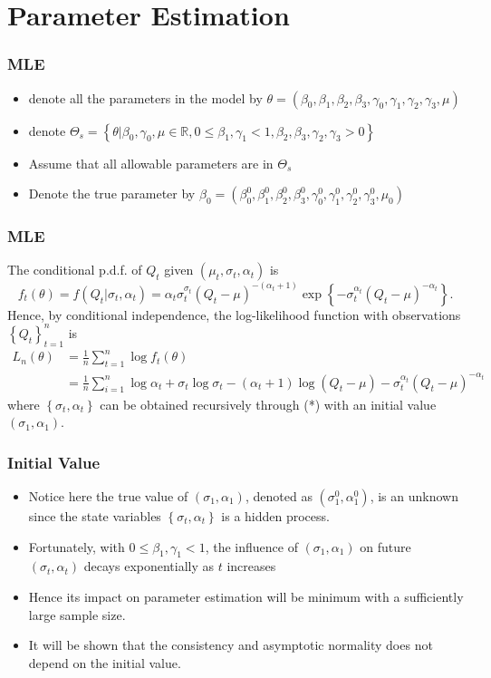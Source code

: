 \documentclass{beamer}
\newcommand{\set}[1]{\left\{#1\right\}}
\begin{document}
\section{Parameter Estimation}


\begin{frame}
    \frametitle{MLE}
    \begin{itemize}
        \item denote all the parameters in the model by $\theta=(\beta_0,\beta_1,\beta_2,\beta_3,\gamma_0,\gamma_1,\gamma_2,\gamma_3,\mu)$
        \bigskip
        \item   denote $\Theta_s=\set{\theta|\beta_0,\gamma_0,\mu\in \mathbb{R}, 0\le \beta_1,\gamma_1<1,\beta_2,\beta_3,\gamma_2,\gamma_3>0}$
        \bigskip
        \item Assume that all allowable parameters are in $\Theta_s$
        \bigskip
        \item Denote the true parameter by $\beta_0=(\beta_0^0,\beta_1^0,\beta_2^0,\beta_3^0,\gamma_0^0,\gamma_1^0,\gamma_2^0,\gamma_3^0,\mu_0)$
    \end{itemize}
\end{frame}


\begin{frame}
    \frametitle{MLE}
    The conditional p.d.f. of $Q_t$ given $(\mu_t,\sigma_t,\alpha_t)$ is 
    $$
f_t(\theta)=f(Q_t|\sigma_t,\alpha_t)=\alpha_t \sigma_t^{\sigma_t}(Q_t-\mu)^{-(\alpha_t+1)} \exp \set{-\sigma_t^{\alpha_t}(Q_t-\mu)^{-\alpha_t}}.
    $$
    Hence, by conditional independence, the log-likelihood function with observations $\set{Q_t}_{t=1}^{n}$ is 
    $$
    \begin{aligned}
L_n(\theta) & =\frac{1}{n}\sum_{t=1}^n \log f_t(\theta)\\
&=\frac{1}{n}\sum_{i=1}^n \log \alpha_t +\sigma_t \log \sigma_t -(\alpha_t+1) \log(Q_t-\mu)-\sigma_t^{\alpha_t}(Q_t-\mu)^{-\alpha_t}
    \end{aligned}
    $$
where $\set{\sigma_t,\alpha_t}$ can be obtained recursively through (*) with an initial value $(\sigma_1,\alpha_1)$.
    

\end{frame}


\begin{frame}
    \frametitle{Initial Value}
    \begin{itemize}
        \item Notice here the true value of $(\sigma_1,\alpha_1)$, denoted as $(\sigma_1^0,\alpha_1^0)$, is an unknown since the state variables $\set{\sigma_t,\alpha_t}$ is a hidden process.
        \medskip
        \item Fortunately, with $0\le \beta_1,\gamma_1<1$, the influence of $(\sigma_1,\alpha_1)$ on future $(\sigma_t,\alpha_t)$ decays exponentially as $t$ increases
        \medskip
        \item Hence its impact on parameter estimation will be minimum with a sufficiently large sample size.
        \medskip
        \item It will be shown that the consistency and asymptotic normality does not depend on the initial value.
    \end{itemize}
\end{frame}
\end{document}
